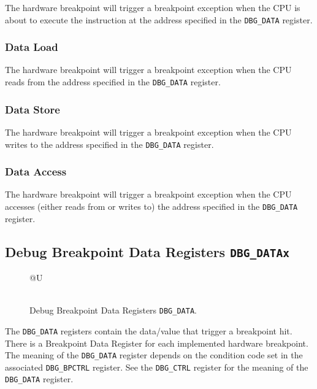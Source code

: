 The hardware breakpoint will trigger a breakpoint exception when the CPU
is about to execute the instruction at the address specified in the
\texttt{DBG\_DATA} register.

\subsubsection{Data Load}\label{data-load}

The hardware breakpoint will trigger a breakpoint exception when the CPU
reads from the address specified in the \texttt{DBG\_DATA} register.

\subsubsection{Data Store}\label{data-store}

The hardware breakpoint will trigger a breakpoint exception when the CPU
writes to the address specified in the \texttt{DBG\_DATA} register.

\subsubsection{Data Access}\label{data-access}

The hardware breakpoint will trigger a breakpoint exception when the CPU
accesses (either reads from or writes to) the address specified in the
\texttt{DBG\_DATA} register.

\subsection{Debug Breakpoint Data Registers
{\tt DBG\_DATAx}}\label{debug-breakpoint-data-registers-dbg_datax}

\begin{figure*}[h!]
	{\footnotesize
		\begin{center}
			\begin{tabular}{@{}U}
				 \\
				\hline
				  \\
				\hline
			\end{tabular}
		\end{center}
	}
	\vspace{-0.1in}
	\caption{Debug Breakpoint Data Registers {\tt DBG\_DATA}.}
	\label{fig:dbgdatareg}
\end{figure*}

The \texttt{DBG\_DATA} registers contain the data/value that trigger a breakpoint
hit. There is a Breakpoint Data Register for each implemented hardware
breakpoint. The meaning of the \texttt{DBG\_DATA} register depends on the
condition code set in the associated \texttt{DBG\_BPCTRL} register. See the
\texttt{DBG\_CTRL} register for the meaning of the \texttt{DBG\_DATA} register.